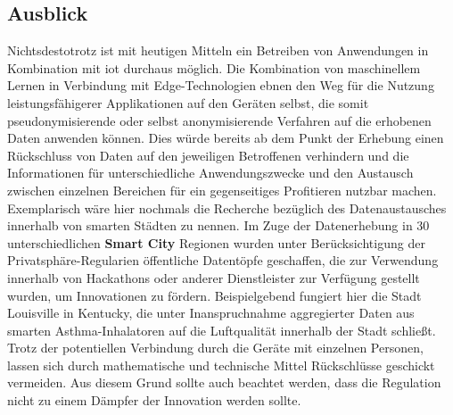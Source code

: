 \subsection{Ausblick}
\label{sec:Zusammenfassung:ssec:Ausblick}
Nichtsdestotrotz ist mit heutigen Mitteln ein Betreiben von Anwendungen in Kombination mit \ac{iot} durchaus möglich. Die Kombination von maschinellem Lernen in Verbindung mit Edge-Technologien ebnen den Weg für die Nutzung leistungsfähigerer Applikationen auf den Geräten selbst, die somit pseudonymisierende oder selbst anonymisierende Verfahren auf die erhobenen Daten anwenden können. Dies würde bereits ab dem Punkt der Erhebung einen Rückschluss von Daten auf den jeweiligen Betroffenen verhindern und die Informationen für unterschiedliche Anwendungszwecke und den Austausch zwischen einzelnen Bereichen für ein gegenseitiges Profitieren nutzbar machen. Exemplarisch wäre hier nochmals die Recherche bezüglich des Datenaustausches innerhalb von smarten Städten \cite{BCG2020} zu nennen. Im Zuge der Datenerhebung in 30 unterschiedlichen \textbf{Smart City} Regionen wurden unter Berücksichtigung der Privatsphäre-Regularien öffentliche Datentöpfe geschaffen, die zur Verwendung innerhalb von Hackathons oder anderer Dienstleister zur Verfügung gestellt wurden, um Innovationen zu fördern. Beispielgebend fungiert hier die Stadt Louisville in Kentucky, die unter Inanspruchnahme aggregierter Daten aus smarten Asthma-Inhalatoren auf die Luftqualität innerhalb der Stadt schließt. Trotz der potentiellen Verbindung durch die Geräte mit einzelnen Personen, lassen sich durch mathematische und technische Mittel Rückschlüsse geschickt vermeiden. Aus diesem Grund sollte auch beachtet werden, dass die Regulation nicht zu einem Dämpfer der Innovation werden sollte.
